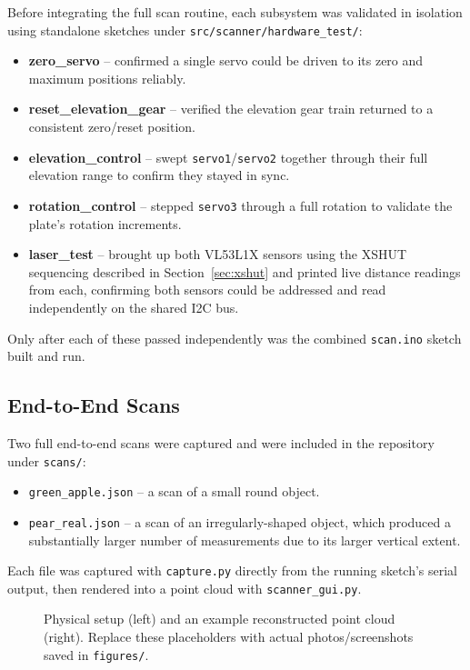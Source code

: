 \documentclass[11pt]{article}
\begin{document}
Before integrating the full scan routine, each subsystem was validated in
isolation using standalone sketches under
\texttt{src/scanner/hardware\_test/}:
\begin{itemize}
  \item \textbf{zero\_servo} -- confirmed a single servo could be driven
    to its zero and maximum positions reliably.
  \item \textbf{reset\_elevation\_gear} -- verified the elevation gear
    train returned to a consistent zero/reset position.
  \item \textbf{elevation\_control} -- swept \texttt{servo1}/\texttt{servo2}
    together through their full elevation range to confirm they stayed in
    sync.
  \item \textbf{rotation\_control} -- stepped \texttt{servo3} through a
    full rotation to validate the plate's rotation increments.
  \item \textbf{laser\_test} -- brought up both VL53L1X sensors using the
    XSHUT sequencing described in Section~\ref{sec:xshut} and printed live
    distance readings from each, confirming both sensors could be
    addressed and read independently on the shared I2C bus.
\end{itemize}
Only after each of these passed independently was the combined
\texttt{scan.ino} sketch built and run.

\subsection{End-to-End Scans}

Two full end-to-end scans were captured and were included in the repository
under \texttt{scans/}:
\begin{itemize}
  \item \texttt{green\_apple.json} -- a scan of a small round object.
  \item \texttt{pear\_real.json} -- a scan of an irregularly-shaped object,
    which produced a substantially larger number of measurements due to
    its larger vertical extent.
\end{itemize}
Each file was captured with \texttt{capture.py} directly from the running
sketch's serial output, then rendered into a point cloud with
\texttt{scanner\_gui.py}.

\begin{figure}[h]
  \centering
  \hfill
  \caption{Physical setup (left) and an example reconstructed point cloud
    (right). Replace these placeholders with actual photos/screenshots
    saved in \texttt{figures/}.}
  \label{fig:results}
\end{figure}
\end{document}
